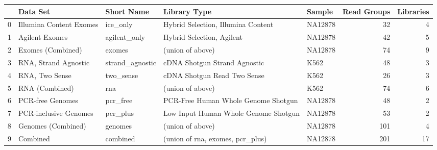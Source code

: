 \begin{tabular}{lllllrr}
\toprule
{} &                 Data Set &       Short Name &                          Library Type &   Sample &  Read Groups &  Libraries \\
\midrule
0 &  Illumina Content Exomes &         ice\_only &    Hybrid Selection, Illumina Content &  NA12878 &           32 &          4 \\
1 &           Agilent Exomes &     agilent\_only &             Hybrid Selection, Agilent &  NA12878 &           42 &          5 \\
2 &        Exomes (Combined) &           exomes &                      (union of above) &  NA12878 &           74 &          9 \\
3 &     RNA, Strand Agnostic &  strand\_agnostic &          cDNA Shotgun Strand Agnostic &     K562 &           48 &          3 \\
4 &           RNA, Two Sense &        two\_sense &           cDNA Shotgun Read Two Sense &     K562 &           26 &          3 \\
5 &           RNA (Combined) &              rna &                      (union of above) &     K562 &           74 &          6 \\
6 &         PCR-free Genomes &         pcr\_free &   PCR-Free Human Whole Genome Shotgun &  NA12878 &           48 &          2 \\
7 &    PCR-inclusive Genomes &         pcr\_plus &  Low Input Human Whole Genome Shotgun &  NA12878 &           53 &          2 \\
8 &       Genomes (Combined) &          genomes &                      (union of above) &  NA12878 &          101 &          4 \\
9 &                 Combined &         combined &      (union of rna, exomes, pcr\_plus) &  NA12878 &          201 &         17 \\
\bottomrule
\end{tabular}
